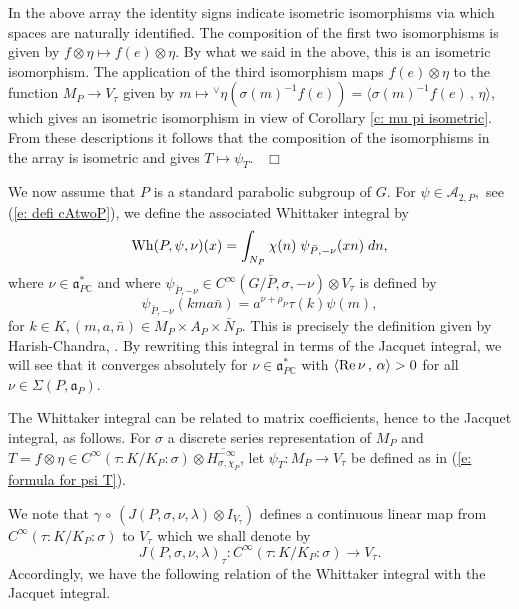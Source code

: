 \documentclass[12pt,a4paper]{article}
\def\qed{~\hfill\hbox{$\Box$}\medbreak}
\def\msy#1{{\mathbb #1}}
\def\C{{\msy C}}
\def\ga{\alpha}
\def\gg{\gamma}
\def\gl{\lambda}
\def\gs{\sigma}
\def\gS{\Sigma}
\def\got#1{\mathfrak #1}
\def\fa{{\got a}}
\def\to{\rightarrow}
\def\Re{{\rm Re}\,}
\def\inp#1#2{\langle#1\,,\,#2\rangle}
\def\after{\,{\scriptstyle\circ}\,}
\def\iC{{\scriptscriptstyle \C}}
\def\cA{{\mathcal A}}
\numberwithin{Thm}{section}
\numberwithin{equation}{section}
\def\bn{n}
\def\Vtau{V_\tau}
\def\Wh{{\rm Wh}}
\def\faPdc{{\fa_{P\iC}^*}}
\numberwithin{equation}{section}
\def\faPdc{\fa_{P\iC}^*}
\def\faP{\fa_P}
\def\cAtwoP{\cA_{2,P}}
\def\cchi{\chi}
\def\gsP{\gs}%
\def\veec{\vee}%
\def\trw{{}^{\scriptscriptstyle\veec}}
\begin{document}
In the above array the identity signs indicate isometric isomorphisms via which spaces are naturally identified. 
The composition of the first two isomorphisms is given by $f \otimes \eta \mapsto f(e)\otimes \eta.$
By what we said in the above, this is an isometric isomorphism.
The application of the third isomorphism maps $f(e) \otimes \eta$ to the function $M_P \to \Vtau$ 
given by  $m \mapsto \trw \eta(\gs(m)^{-1}f(e)) = \inp{\gs(m)^{-1}f(e)}{\eta},$  which gives an isometric isomorphism 
in view of Corollary \ref{c: mu pi isometric}. From these descriptions it follows
that the composition of the isomorphisms in the array is isometric and gives $T \mapsto \psi_T.$ 
\qed

We now assume that $P$ is a standard parabolic subgroup of $G.$ 
For $\psi \in \cAtwoP,$ see (\ref{e: defi cAtwoP}),
 we define the associated Whittaker integral by 
\begin{equation}
\label{e: defi whittaker int}
\Wh(P, \psi, \nu) (x) = \int_{N_P} \cchi(n) \;\psi_{\bar P, -\nu}(xn)\; d \bn,
\end{equation}
%
where $\nu \in \faPdc$ and where $ \psi_{\bar P, -\nu} \in C^\infty(G/\bar P,  \gs,  -\nu) \otimes \Vtau$ is defined by 
$$
\psi_{\bar P, -\nu} (k m a \bar n) = a^{\nu + \rho_P} \tau(k) \psi(m),
$$%
for $k \in K, (m,a,\bar n) \in M_P\times A_P \times \bar N_P.$ 
This is precisely the definition given by Harish-Chandra, \cite[\S 1.7, p.147]{HCwhit}.
By rewriting this integral in terms of the Jacquet integral, we will see 
that it converges absolutely for $\nu \in \faPdc$ with $\inp{\Re \nu}{\ga} > 0$ for all $\nu \in \gS(P,\faP).$ 

The Whittaker integral can be related to matrix coefficients, hence to the Jacquet integral, 
as follows.
For $\gs$ a discrete series representation of $M_P$ and 
$T = f \otimes \eta \in C^\infty(\tau: K/K_P: \gsP) \otimes \overline{ H_{\gs,\chi_P}^{-\infty}}$, let 
$\psi_{T}: M_P \to V_\tau$ be defined
as in (\ref{e: formula for psi T}).


We note that $\gg \after (J(P,\gs,\nu,\gl) \otimes I_{\Vtau})$ defines a continuous linear map 
from $C^\infty(\tau: K/K_P: \gs)$ to $\Vtau$ which we shall denote by 
$$
J(P,\gs,\nu,\gl)_\tau: C^\infty(\tau: K/K_P: \gs) \to \Vtau.
$$ 
Accordingly, we have the following relation of the Whittaker integral 
with the Jacquet integral.
\end{document}
